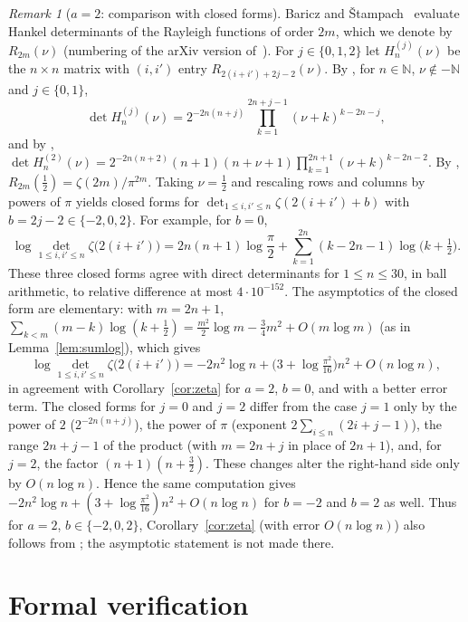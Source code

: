 \documentclass{amsart}
\theoremstyle{definition}
\theoremstyle{remark}
\newtheorem{remark}[theorem]{Remark}
\numberwithin{equation}{section}
\newcommand{\N}{\mathbb{N}}
\begin{document}
\begin{remark}[$a=2$: comparison with closed forms]\label{rem:bs}
Baricz and \v{S}tampach~\cite{BariczStampach} evaluate Hankel determinants of the Rayleigh functions of order $2m$,
which we denote by $R_{2m}(\nu)$ (numbering of the arXiv version of~\cite{BariczStampach}). For $j\in\{0,1,2\}$ let
$H_n^{(j)}(\nu)$ be the $n\times n$ matrix with $(i,i')$ entry $R_{2(i+i')+2j-2}(\nu)$. By \cite[Cor.~3]{BariczStampach},
for $n\in\N$, $\nu\notin-\N$ and $j\in\{0,1\}$,
\[
  \det H_n^{(j)}(\nu)=2^{-2n(n+j)}\prod_{k=1}^{2n+j-1}(\nu+k)^{k-2n-j},
\]
and by \cite[Rem.~5]{BariczStampach},
$\det H_n^{(2)}(\nu)=2^{-2n(n+2)}(n+1)(n+\nu+1)\prod_{k=1}^{2n+1}(\nu+k)^{k-2n-2}$. By \cite[(22)]{BariczStampach},
$R_{2m}(\frac12)=\zeta(2m)/\pi^{2m}$. Taking $\nu=\frac12$ and rescaling rows and columns by
powers of $\pi$ yields closed forms for $\det_{1\le i,i'\le n}\zeta(2(i+i')+b)$ with $b=2j-2\in\{-2,0,2\}$. For
example, for $b=0$,
\[
  \log\det_{1\le i,i'\le n}\zeta\bigl(2(i+i')\bigr)=2n(n+1)\log\frac\pi2+\sum_{k=1}^{2n}(k-2n-1)\log\bigl(k+\tfrac12\bigr).
\]
These three closed forms agree with direct determinants for $1\le n\le30$, in ball arithmetic, to relative
difference at most $4\cdot10^{-152}$. The asymptotics of the closed form are elementary: with $m=2n+1$,
$\sum_{k<m}(m-k)\log(k+\frac12)=\frac{m^2}{2}\log m-\frac34m^2+O(m\log m)$ (as in Lemma~\ref{lem:sumlog}), which gives
\[
  \log\det_{1\le i,i'\le n}\zeta\bigl(2(i+i')\bigr)=-2n^2\log n+\bigl(3+\log\tfrac{\pi^2}{16}\bigr)n^2+O(n\log n),
\]
in agreement with Corollary~\ref{cor:zeta} for $a=2$, $b=0$, and with a better error term. The closed forms for
$j=0$ and $j=2$ differ from the case $j=1$ only by the power of $2$ ($2^{-2n(n+j)}$), the power of $\pi$ (exponent
$2\sum_{i\le n}(2i+j-1)$), the range $2n+j-1$ of the product (with $m=2n+j$ in place of $2n+1$), and, for $j=2$, the
factor $(n+1)(n+\frac32)$. These changes alter the right-hand side only by $O(n\log n)$. Hence the same computation
gives $-2n^2\log n+(3+\log\frac{\pi^2}{16})n^2+O(n\log n)$ for $b=-2$ and $b=2$ as well. Thus for $a=2$,
$b\in\{-2,0,2\}$, Corollary~\ref{cor:zeta} (with error $O(n\log n)$) also follows from \cite{BariczStampach}; the
asymptotic statement is not made there.
\end{remark}

\section{Formal verification}\label{sec:lean}
\end{document}
